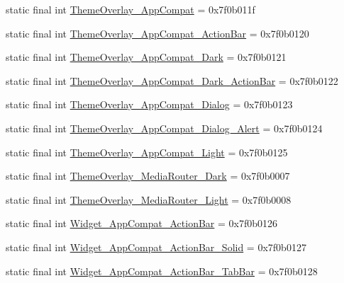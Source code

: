 \begin{CompactItemize}
static final int \hyperlink{classandroid_1_1support_1_1v7_1_1appcompat_1_1_r_1_1style_668a2f0939154671340a05af61d835ab}{ThemeOverlay\_\-AppCompat} = 0x7f0b011f
\item 
static final int \hyperlink{classandroid_1_1support_1_1v7_1_1appcompat_1_1_r_1_1style_9b35d227a6c199e3e3f74c1d023147af}{ThemeOverlay\_\-AppCompat\_\-ActionBar} = 0x7f0b0120
\item 
static final int \hyperlink{classandroid_1_1support_1_1v7_1_1appcompat_1_1_r_1_1style_9897f4589c1335728ca806156c2c80c0}{ThemeOverlay\_\-AppCompat\_\-Dark} = 0x7f0b0121
\item 
static final int \hyperlink{classandroid_1_1support_1_1v7_1_1appcompat_1_1_r_1_1style_d02401dee0a39e626efc0bc844ea2e3a}{ThemeOverlay\_\-AppCompat\_\-Dark\_\-ActionBar} = 0x7f0b0122
\item 
static final int \hyperlink{classandroid_1_1support_1_1v7_1_1appcompat_1_1_r_1_1style_bb6f7203133e8901c9272bba8175739d}{ThemeOverlay\_\-AppCompat\_\-Dialog} = 0x7f0b0123
\item 
static final int \hyperlink{classandroid_1_1support_1_1v7_1_1appcompat_1_1_r_1_1style_79737cf27c3d382540279c252d22096e}{ThemeOverlay\_\-AppCompat\_\-Dialog\_\-Alert} = 0x7f0b0124
\item 
static final int \hyperlink{classandroid_1_1support_1_1v7_1_1appcompat_1_1_r_1_1style_00b5de46919f6ab6349541756b76a725}{ThemeOverlay\_\-AppCompat\_\-Light} = 0x7f0b0125
\item 
static final int \hyperlink{classandroid_1_1support_1_1v7_1_1appcompat_1_1_r_1_1style_5617688af59f646464283f28fe60fb6a}{ThemeOverlay\_\-MediaRouter\_\-Dark} = 0x7f0b0007
\item 
static final int \hyperlink{classandroid_1_1support_1_1v7_1_1appcompat_1_1_r_1_1style_8c909fdbe73e980c7ee047465238e831}{ThemeOverlay\_\-MediaRouter\_\-Light} = 0x7f0b0008
\item 
static final int \hyperlink{classandroid_1_1support_1_1v7_1_1appcompat_1_1_r_1_1style_8b87f31c4e65505c951885b8ac3ce236}{Widget\_\-AppCompat\_\-ActionBar} = 0x7f0b0126
\item 
static final int \hyperlink{classandroid_1_1support_1_1v7_1_1appcompat_1_1_r_1_1style_0506daeedf88887506830712a614ccdb}{Widget\_\-AppCompat\_\-ActionBar\_\-Solid} = 0x7f0b0127
\item 
static final int \hyperlink{classandroid_1_1support_1_1v7_1_1appcompat_1_1_r_1_1style_97f7d6b260729ea70d77a90310fd028e}{Widget\_\-AppCompat\_\-ActionBar\_\-TabBar} = 0x7f0b0128
\item 

\end{CompactItemize}

